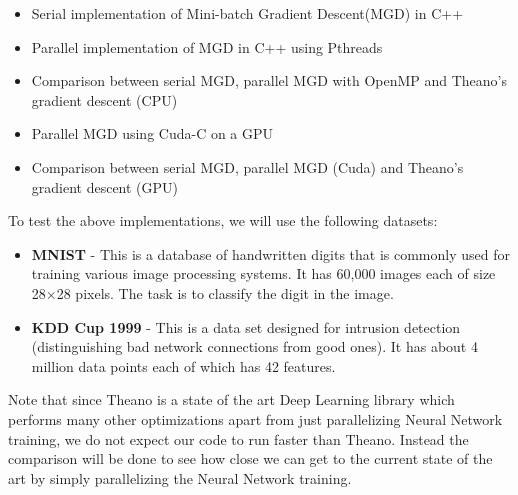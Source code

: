 \begin{itemize}
    \item Serial implementation of Mini-batch Gradient Descent(MGD) in C++
    \item Parallel implementation of MGD in C++ using Pthreads
    \item Comparison between serial MGD, parallel MGD with OpenMP and Theano's gradient descent (CPU)
    \item Parallel MGD using Cuda-C on a GPU
    \item Comparison between serial MGD, parallel MGD (Cuda) and Theano's gradient descent (GPU)
\end{itemize}

To test the above implementations, we will use the following datasets: 
\begin{itemize}
    \item \textbf{MNIST} - This is a database of handwritten digits that is commonly used for training various image processing systems. It has 60,000 images each of size 28$\times$28 pixels. The task is to classify the digit in the image. 
    \item \textbf{KDD Cup 1999} - This is a data set designed for intrusion detection (distinguishing bad network connections from good ones). It has about 4 million data points each of which has 42 features.  
\end{itemize}

Note that since Theano is a state of the art Deep Learning library which performs many other optimizations apart from just parallelizing Neural Network training, we do not expect our code to run faster than Theano. Instead the comparison will be done to see how close we can get to the current state of the art by simply parallelizing the Neural Network training.